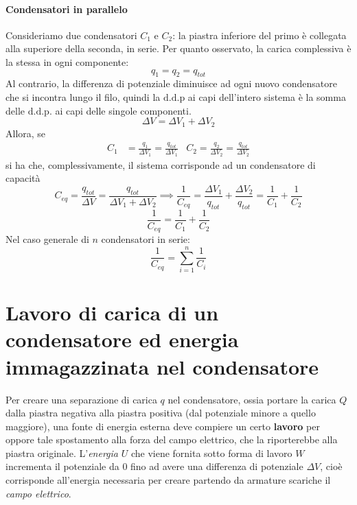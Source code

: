 \paragraph{Condensatori in parallelo}
Consideriamo due condensatori $C_1$ e $C_2$: la piastra inferiore del primo è collegata alla superiore della seconda, in serie.
Per quanto osservato, la carica complessiva è la stessa in ogni componente:
\begin{equation*}
	q_1=q_2=q_{tot}
\end{equation*}
Al contrario, la differenza di potenziale diminuisce ad ogni nuovo condensatore che si incontra lungo il filo, quindi la $\mathrm{d.d.p}$ ai capi dell'intero sistema è la somma delle $\mathrm{d.d.p.}$ ai capi delle singole componenti.
\begin{equation*}
	\Delta V=\Delta V_1+\Delta V_2
\end{equation*}
Allora, se
\begin{align*}
	C_1&=\frac{q_1}{\Delta V_1}=\frac{q_{tot}}{\Delta V_1} & C_2=\frac{q_2}{\Delta V_2}=\frac{q_{tot}}{\Delta V_2}
\end{align*}
si ha che, complessivamente, il sistema corrisponde ad un condensatore di capacità
\begin{equation*}
	C_{eq}=\frac{q_{tot}}{\Delta V}=\frac{q_{tot}}{\Delta V_1+\Delta V_2}\implies \frac{1}{C_{eq}}=\frac{\Delta V_1}{q_{tot}}+\frac{\Delta V_2}{q_{tot}}=\frac{1}{C_1}+\frac{1}{C_2}
\end{equation*}
\begin{equation}
	\frac{1}{C_{eq}}=\frac{1}{C_1}+\frac{1}{C_2}
\end{equation}
Nel caso generale di $n$ condensatori in serie:
\begin{equation}
	\frac{1}{C_{eq}}=\sum_{i=1}^{n}\frac{1}{C_i}
\end{equation}
\section{Lavoro di carica di un condensatore ed energia immagazzinata nel condensatore} %
Per creare una separazione di carica $q$ nel condensatore, ossia portare la carica $Q$ dalla piastra negativa alla piastra positiva (dal potenziale minore a quello maggiore), una fonte di energia esterna deve compiere un certo \textbf{lavoro} per oppore tale spostamento alla forza del campo elettrico, che la riporterebbe alla piastra originale. L'\textit{energia} $U$ che viene fornita sotto forma di lavoro $W$ incrementa il potenziale da $0$ fino ad avere una differenza di potenziale $\Delta V$, cioè corrisponde all'energia necessaria per creare partendo da armature scariche il \textit{campo elettrico}.

